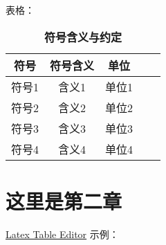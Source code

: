 \documentclass[UTF8]{report}
\theoremstyle{MyLineTheoremStyle} %
\theoremstyle{MyBlockTheoremStyle} %
\theoremstyle{MySubsubsectionStyle} %
\begin{document}
\newpage
表格：

\begin{table}[H]
    \centering
    \caption{\textbf{符号含义与约定}}
    \label{tab:waterpump}
    \begin{tabular}{ccccc}
    \toprule
    符号 & 符号含义& 单位\\
    \midrule
    符号1& 含义1& 单位1\\
    符号2& 含义2& 单位2\\
    符号3& 含义3& 单位3\\
    符号4& 含义4& 单位4\\
    \bottomrule
    \end{tabular}
\end{table}

\chapter{这里是第二章}\thispagestyle{fancy} 

\href{https://www.latex-tables.com/}{Latex Table Editor} 示例：

\end{document}
